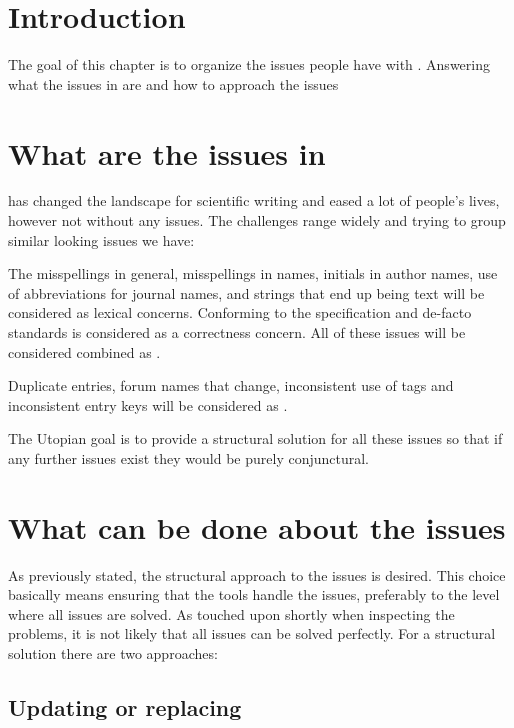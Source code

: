 \section{Introduction}
The goal of this chapter is to organize the issues people have with
{\bibtex}.  Answering what the issues in {\bibtex} are
 and how to approach the {\bibtex}
issues 

\section{What are the issues in {\bibtex}}
\label{sec:intro_what_issues}

{\bibtex} has changed the landscape for scientific writing and eased a
lot of people's lives, however not without any issues.  The challenges
range widely and trying to group similar looking issues we have:

The misspellings in general, misspellings in names, initials in author
names, use of abbreviations for journal names, and {\bibtex} strings
that end up being text will be considered as lexical concerns.
Conforming to the specification and de-facto standards is considered
as a correctness concern.  All of these issues will be considered
combined as .

Duplicate entries, forum names that change, inconsistent use of tags
and inconsistent entry keys will be considered as .

The Utopian goal is to provide a structural solution for all these
issues so that if any further issues exist they would be purely
conjunctural.


\section{What can be done about the {\bibtex} issues}
\label{sec:intro_what_to_do}

As previously stated, the structural approach to the issues is desired.
This choice basically means ensuring that the tools handle the
issues, preferably to the level where all issues are solved.  As
touched upon shortly when inspecting the problems, it is not likely
that all issues can be solved perfectly.  For a structural solution
there are two approaches:


\subsection{Updating or replacing {\bibtex}}

